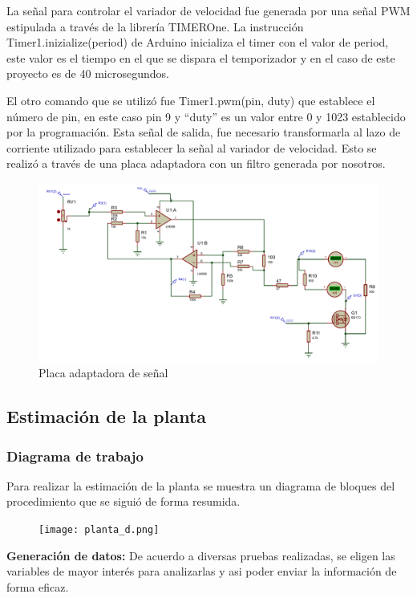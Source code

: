 La señal para controlar el variador de velocidad fue generada por una señal PWM estipulada a través de la librería TIMEROne. La instrucción Timer1.inizialize(period)
 de Arduino inicializa el timer con el valor de period, este valor es el tiempo en el que se dispara el temporizador y en el caso de este proyecto es de 40 microsegundos.
 
El otro comando que se utilizó fue Timer1.pwm(pin, duty) que establece el número de pin, en este caso pin 9 y “duty” es un valor entre 0 y 1023 establecido por la programación. 
Esta señal de salida, fue necesario transformarla al lazo de corriente utilizado para establecer la señal al variador de velocidad. Esto se realizó a través de una placa adaptadora con un filtro generada por nosotros.
\begin{figure}[htbp]
	\centering
	\includegraphics[width=0.8\linewidth]{imagenes/plano_DC.pdf}
	\caption{Placa adaptadora de señal}
	\label{fig:adapt}
\end{figure}



\subsection{Estimación de la planta}
    \subsubsection{Diagrama de trabajo}

Para realizar la estimación de la planta se muestra un diagrama de bloques del procedimiento que se siguió de forma resumida.

\begin{figure}[htb]
	\centering
	\texttt{[image: planta\_d.png]}
	\label{fig:planta_d}
\end{figure}

 \textbf{Generación de datos:} De acuerdo a diversas pruebas realizadas, se eligen las variables de mayor interés para analizarlas y asi poder enviar la información de forma eficaz.

